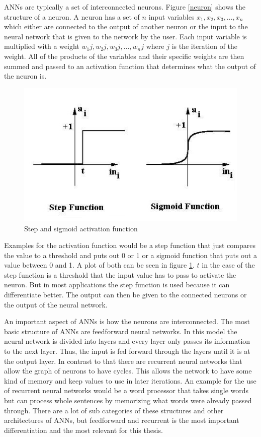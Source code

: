 ANNs are typically a set of interconnected neurons. Figure \ref{neuron} shows the structure of a neuron. A neuron has a set of $n$ input variables $x_1, x_2, x_3, ..., x_n$ which either are connected to the output of another neuron or the input to the neural network that is given to the network by the user. Each input variable is multiplied with a weight $w_1j, w_2j, w_3j, ..., w_nj$ where $j$ is the iteration of the weight. All of the products of the variables and their specific weights are then summed and passed to an activation function that determines what the output of the neuron is.

\begin{figure}[ht]
	\centering
  \includegraphics[scale=0.6]{figures/activation_functions.jpg}
	\caption[Step and sigmoid activation function]{Step and sigmoid activation function \protect\footnotemark}
	\label{activation_functions}
\end{figure}

Examples for the activation function would be a step function that just compares the value to a threshold and puts out 0 or 1 or a sigmoid function that puts out a value between 0 and 1. A plot of both can be seen in figure \ref{activation_functions}. $t$ in the case of the step function is a threshold that the input value has to pass to activate the neuron. But in most applications the step function is used because it can differentiate better. The output can then be given to the connected neurons or the output of the neural network.

An important aspect of ANNs is how the neurons are interconnected. The most basic structure of ANNs are feedforward neural networks. In this model the neural network is divided into layers and every layer only passes its information to the next layer. Thus, the input is fed forward through the layers until it is at the output layer. In contrast to that there are recurrent neural networks that allow the graph of neurons to have cycles. This allows the network to have some kind of memory and keep values to use in later iterations. An example for the use of recurrent neural networks would be a word processor that takes single words but can process whole sentences by memorizing what words were already passed through. There are a lot of sub categories of these structures and other architectures of ANNs, but feedforward and recurrent is the most important differentiation and the most relevant for this thesis.

